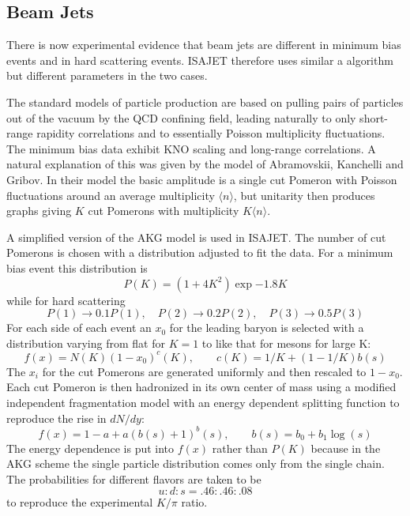 \subsection{Beam Jets}

      There is now experimental evidence that beam jets are different in
minimum bias events and in hard scattering events. ISAJET therefore uses
similar a algorithm but different parameters in the two cases.

      The standard models of particle production are based on pulling
pairs of particles out of the vacuum by the QCD confining field,
leading naturally to only short-range rapidity correlations and to
essentially Poisson multiplicity fluctuations. The minimum bias data
exhibit KNO scaling and long-range correlations. A natural explanation
of this was given by the model of Abramovskii, Kanchelli and Gribov.
In their model the basic amplitude is a single cut Pomeron with
Poisson fluctuations around an average multiplicity $\langle n
\rangle$, but unitarity then produces graphs giving $K$ cut Pomerons
with multiplicity $K\langle n \rangle$.

      A simplified version of the AKG model is used in ISAJET. The
number of cut Pomerons is chosen with a distribution adjusted to fit the
data. For a minimum bias event this distribution is
$$
P(K) = ( 1 + 4 K^2 ) \exp{-1.8 K}
$$
while for hard scattering
$$
P(1) \to 0.1 P(1),\quad  P(2) \to 0.2 P(2),\quad  P(3) \to 0.5 P(3)
$$
For each side of each event an $x_0$ for the leading baryon is selected
with a distribution varying from flat for $K = 1$ to like that for
mesons for large K:
$$
f(x) = N(K) (1- x_0)^c(K),\qquad c(K) = 1/K + ( 1 - 1/K ) b(s)
$$
The $x_i$ for the cut Pomerons are generated uniformly and then
rescaled to $1-x_0$. Each cut Pomeron is then hadronized in its own
center of mass using a modified independent fragmentation model with
an energy dependent splitting function to reproduce the rise in
$dN/dy$:
$$
f(x) = 1 - a  +  a(b(s) + 1)^ b(s),\qquad 
b(s) = b_0 + b_1  \log(s)
$$
The energy dependence is put into $f(x)$ rather than $P(K)$ because in
the AKG scheme the single particle distribution comes only from the
single chain. The probabilities for different flavors are taken to be
$$
u : d : s = .46 : .46 : .08
$$
to reproduce the experimental $K/\pi$ ratio.
